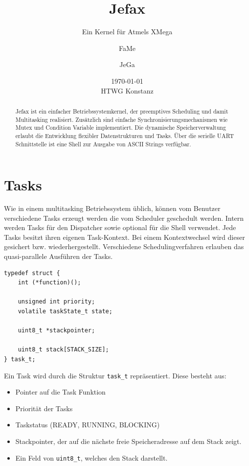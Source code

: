 \documentclass[fontsize=12pt, toc=bibliography, notitlepage]{scrreprt}
\title{Jefax}
\subtitle{Ein Kernel für Atmels XMega}
\author{FaMe \and JeGa}
\date{\today \\ HTWG Konstanz}
\begin{document}
\maketitle

\begin{abstract}
Jefax ist ein einfacher Betriebssystemkernel, der preemptives Scheduling und damit Multitasking realisiert. Zusätzlich sind einfache Synchronisierungsmechanismen wie Mutex und Condition Variable implementiert. Die dynamische Speicherverwaltung erlaubt die Entwicklung flexibler Datenstrukturen und Tasks. Über die serielle UART Schnittstelle ist eine Shell zur Ausgabe von ASCII Strings verfügbar.
\end{abstract}
\clearpage

\tableofcontents

\chapter{Tasks}
\label{chap:tasks}
Wie in einem multitasking Betriebssystem üblich, können vom Benutzer verschiedene Tasks erzeugt werden die vom Scheduler geschedult werden. Intern werden Tasks für den Dispatcher sowie optional für die Shell verwendet. Jede Tasks besitzt ihren eigenen Task-Kontext. Bei einem Kontextwechsel wird dieser gesichert bzw. wiederhergestellt. Verschiedene Schedulingverfahren erlauben das quasi-parallele Ausführen der Tasks. \\

\begin{lstlisting}[title=task.h]
typedef struct {
	int (*function)();

	unsigned int priority;
	volatile taskState_t state;

	uint8_t *stackpointer;

	uint8_t stack[STACK_SIZE];
} task_t;
\end{lstlisting}

Ein Task wird durch die Struktur \lstinline$task_t$ repräsentiert. Diese besteht aus:

\begin{itemize}
\item Pointer auf die Task Funktion
\item Priorität der Tasks
\item Taskstatus (READY, RUNNING, BLOCKING)
\item Stackpointer, der auf die nächste freie Speicheradresse auf dem Stack zeigt.
\item Ein Feld von \lstinline$uint8_t$, welches den Stack darstellt.
\end{itemize}
\end{document}
